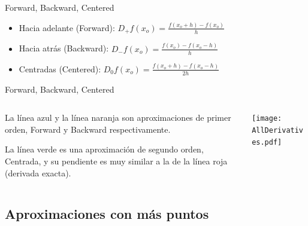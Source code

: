 \documentclass{beamer}
\begin{document}
\begin{frame}{Forward, Backward, Centered}

\begin{footnotesize}
\begin{itemize}
	\item Hacia adelante (Forward): $\displaystyle D_+f(x_o) = \frac{f(x_o+h)-f(x_o)}{h}$
	\item Hacia atrás (Backward): $\displaystyle D_-f(x_o) = \frac{f(x_o)-f(x_o-h)}{h}$
	\item Centradas (Centered): $\displaystyle D_0 f(x_o) = \frac{f(x_o+h) - f(x_o-h)}{2h}$
\end{itemize}
\end{footnotesize}

\begin{footnotesize}
\begin{block}{Forward, Backward, Centered}
\begin{columns}[t]
\begin{column}{0.35\textwidth}
La línea azul y la línea naranja son aproximaciones de primer orden, Forward y Backward respectivamente.

\strut

La línea verde es una aproximación de segundo orden, Centrada, y su pendiente es muy similar a la
de la línea roja (derivada exacta).
\end{column}
\begin{column}[t]{0.60\textwidth}
\texttt{[image: AllDerivatives.pdf]}
\end{column}
\end{columns}
\end{block}
\end{footnotesize}

\end{frame}

\subsection{Aproximaciones con más puntos}
\end{document}
